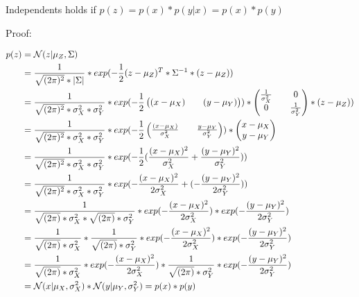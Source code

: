 Independents holds if $p(z) =p(x)*p(y|x) =p(x)*p(y) $ 

Proof:

\begin{align*}
p(z) &= \mathcal{N}(z|\mu_Z,\Sigma) \\
&= \frac{1}{\sqrt{(2\pi)^2}*|\Sigma|}*exp(-\frac{1}{2}(z-\mu_Z)^T *\Sigma^{-1}*(z-\mu_Z) )\\
&=\frac{1}{\sqrt{(2\pi)^2}*\sigma_{X}^2 *\sigma_{Y}^2  } * exp(-\frac{1}{2}\begin{pmatrix} (x-\mu_{X}) && (y-\mu_{Y}) \end{pmatrix}) 
*\begin{pmatrix}
\frac{1}{\sigma_{X}^2} && 0 \\
0           && \frac{1}{\sigma_{Y}^2} 
\end{pmatrix}
*(z-\mu_Z) )\\
&=\frac{1}{\sqrt{(2\pi)^2}*\sigma_{X}^2 *\sigma_{Y}^2  } * exp(-\frac{1}{2}\begin{pmatrix} \frac{(x-\mu_{X})}{\sigma_{X}^2} && \frac{y-\mu_{Y}}{\sigma_{Y}^2} \end{pmatrix}) 
*\begin{pmatrix}
x-\mu_{X} \\
y-\mu_{Y} 
\end{pmatrix} \\
&=\frac{1}{\sqrt{(2\pi)^2}*\sigma_{X}^2 *\sigma_{Y}^2  } * exp(-\frac{1}{2} (\frac{(x-\mu_{X})^2}{\sigma_{X}^2} + \frac{(y-\mu_{Y})^2}{\sigma_{Y}^2}) )\\
&=\frac{1}{\sqrt{(2\pi)^2}*\sigma_{X}^2 *\sigma_{Y}^2  } * exp(-\frac{(x-\mu_{X})^2}{2\sigma_{X}^2} + (-\frac{(y-\mu_{Y})^2}{2\sigma_{Y}^2}) )\\ 
&=\frac{1}{\sqrt{(2\pi)}*\sigma_{X}^2 * \sqrt{(2\pi)}* \sigma_{Y}^2  } * exp(-\frac{(x-\mu_{X})^2}{2\sigma_{X}^2}) * exp (-\frac{(y-\mu_{Y})^2}{2\sigma_{Y}^2})\\ 
&=\frac{1}{\sqrt{(2\pi)}*\sigma_{X}^2}*\frac{1}{\sqrt{(2\pi)}* \sigma_{Y}^2  } * exp(-\frac{(x-\mu_{X})^2}{2\sigma_{X}^2}) * exp (-\frac{(y-\mu_{Y})^2}{2\sigma_{Y}^2})\\
&=\frac{1}{\sqrt{(2\pi)}*\sigma_{X}^2} * exp(-\frac{(x-\mu_{X})^2}{2\sigma_{X}^2}) * \frac{1}{\sqrt{(2\pi)}* \sigma_{Y}^2  } * exp (-\frac{(y-\mu_{Y})^2}{2\sigma_{Y}^2})\\
&= \mathcal{N}(x|\mu_X,\sigma_X^2) * \mathcal{N}(y|\mu_Y,\sigma_Y^2) = p(x)*p(y) \\
\end{align*}

